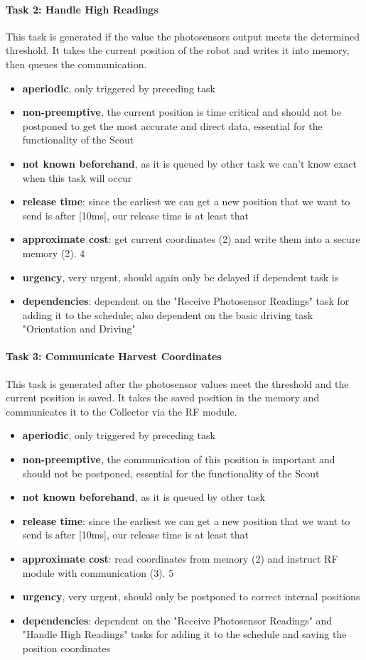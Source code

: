 \documentclass[12pt]{article}
\begin{document}
\paragraph{Task 2: Handle High Readings}
This task is generated if the value the photosensors output meets the determined threshold. It takes the current position of the robot and writes it into memory, then queues the communication.
\begin{itemize}
	\item \textbf{aperiodic}, only triggered by preceding task
	\item \textbf{non-preemptive}, the current position is time critical and should not be postponed to get the most accurate and direct data, essential for the functionality of the Scout
	\item \textbf{not known beforehand}, as it is queued by other task we can't know exact when this task will occur
	\item \textbf{release time}: since the earliest we can get a new position that we want to send is after [10ms], our release time is at least that
	\item \textbf{approximate cost}: get current coordinates (2) and write them into a secure memory (2). 4
	\item \textbf{urgency}, very urgent, should again only be delayed if dependent task is
	\item \textbf{dependencies}: dependent on the "Receive Photosensor Readings" task for adding it to the schedule; also dependent on the basic driving task "Orientation and Driving"
\end{itemize}

\paragraph{Task 3: Communicate Harvest Coordinates}
This task is generated after the photosensor values meet the threshold and the current position is saved. It takes the saved position in the memory and communicates it to the Collector via the RF module.
\begin{itemize}
	\item \textbf{aperiodic}, only triggered by preceding task
	\item \textbf{non-preemptive}, the communication of this position is important and should not be postponed, essential for the functionality of the Scout
	\item \textbf{not known beforehand}, as it is queued by other task
	\item \textbf{release time}: since the earliest we can get a new position that we want to send is after [10ms], our release time is at least that
	\item \textbf{approximate cost}: read coordinates from memory (2) and instruct RF module with communication (3). 5
	\item \textbf{urgency}, very urgent, should only be postponed to correct internal positions
	\item \textbf{dependencies}: dependent on the "Receive Photosensor Readings" and "Handle High Readings" tasks for adding it to the schedule and saving the position coordinates
\end{itemize}
\end{document}

